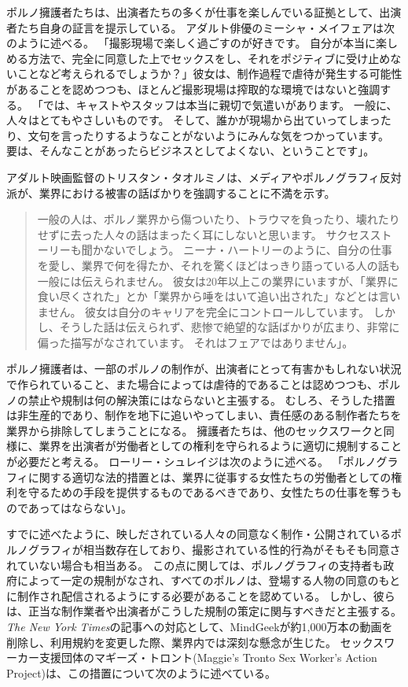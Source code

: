 \documentclass[paper=a4,book,openany]{jlreq}
\begin{document}
ポルノ擁護者たちは、出演者たちの多くが仕事を楽しんでいる証拠として、出演者たち自身の証言を提示している。
アダルト俳優のミーシャ・メイフェアは次のように述べる。
「撮影現場で楽しく過ごすのが好きです。
自分が本当に楽しめる方法で、完全に同意した上でセックスをし、それをポジティブに受け止めないことなど考えられるでしょうか？」彼女は、制作過程で虐待が発生する可能性があることを認めつつも、ほとんど撮影現場は搾取的な環境ではないと強調する。
「では、キャストやスタッフは本当に親切で気遣いがあります。
一般に、人々はとてもやさしいものです。
そして、誰かが現場から出ていってしまったり、文句を言ったりするようなことがないようにみんな気をつかっています。
要は、そんなことがあったらビジネスとしてよくない、ということです」\citep{sisley19:_common_myths_porn_debun_porn_perfor}。

アダルト映画監督のトリスタン・タオルミノは、メディアやポルノグラフィ反対派が、業界における被害の話ばかりを強調することに不満を示す。

\begin{quote}
一般の人は、ポルノ業界から傷ついたり、トラウマを負ったり、壊れたりせずに去った人々の話はまったく耳にしないと思います。
サクセスストーリーも聞かないでしょう。
ニーナ・ハートリーのように、自分の仕事を愛し、業界で何を得たか、それを驚くほどはっきり語っている人の話も一般には伝えられません。
彼女は20年以上この業界にいますが、「業界に食い尽くされた」とか「業界から唾をはいて追い出された」などとは言いません。
彼女は自分のキャリアを完全にコントロールしています。
しかし、そうした話は伝えられず、悲惨で絶望的な話ばかりが広まり、非常に偏った描写がなされています。
それはフェアではありません」。
\citep{sachs12:_inter_femin_pornog}
\end{quote}

ポルノ擁護者は、一部のポルノの制作が、出演者にとって有害かもしれない状況で作られていること、また場合によっては虐待的であることは認めつつも、ポルノの禁止や規制は何の解決策にはならないと主張する。
むしろ、そうした措置は非生産的であり、制作を地下に追いやってしまい、責任感のある制作者たちを業界から排除してしまうことになる。
擁護者たちは、他のセックスワークと同様に、業界を出演者が労働者としての権利を守られるように適切に規制することが必要だと考える。
ローリー・シュレイジは次のように述べる。
「ポルノグラフィに関する適切な法的措置とは、業界に従事する女性たちの労働者としての権利を守るための手段を提供するものであるべきであり、女性たちの仕事を奪うものであってはならない」\citep[p.58]{shrage05:_expos_fallac_anti_femin}。

すでに述べたように、映しだされている人々の同意なく制作・公開されているポルノグラフィが相当数存在しており、撮影されている性的行為がそもそも同意されていない場合も相当ある。
この点に関しては、ポルノグラフィの支持者も政府によって一定の規制がなされ、すべてのポルノは、登場する人物の同意のもとに制作され配信されるようにする必要があることを認めている。
しかし、彼らは、正当な制作業者や出演者がこうした規制の策定に関与すべきだと主張する。
\emph{The New York Times}の記事への対応として、MindGeekが約1,000万本の動画を削除し、利用規約を変更した際、業界内では深刻な懸念が生じた。
セックスワーカー支援団体のマギーズ・トロント(Maggie's Tronto Sex Worker's Action Project)は、この措置について次のように述べている。
\end{document}
